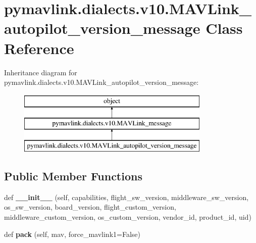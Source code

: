 \hypertarget{classpymavlink_1_1dialects_1_1v10_1_1MAVLink__autopilot__version__message}{}\section{pymavlink.\+dialects.\+v10.\+M\+A\+V\+Link\+\_\+autopilot\+\_\+version\+\_\+message Class Reference}
\label{classpymavlink_1_1dialects_1_1v10_1_1MAVLink__autopilot__version__message}
Inheritance diagram for pymavlink.\+dialects.\+v10.\+M\+A\+V\+Link\+\_\+autopilot\+\_\+version\+\_\+message\+:\begin{figure}[H]
\begin{center}
\leavevmode
\includegraphics[height=3.000000cm]{classpymavlink_1_1dialects_1_1v10_1_1MAVLink__autopilot__version__message}
\end{center}
\end{figure}
\subsection*{Public Member Functions}
\begin{DoxyCompactItemize}
\item 
\mbox{\label{classpymavlink_1_1dialects_1_1v10_1_1MAVLink__autopilot__version__message_a128e05bddb041154103e8fa108c3840f}} 
def {\bfseries \+\_\+\+\_\+init\+\_\+\+\_\+} (self, capabilities, flight\+\_\+sw\+\_\+version, middleware\+\_\+sw\+\_\+version, os\+\_\+sw\+\_\+version, board\+\_\+version, flight\+\_\+custom\+\_\+version, middleware\+\_\+custom\+\_\+version, os\+\_\+custom\+\_\+version, vendor\+\_\+id, product\+\_\+id, uid)
\item 
\mbox{\label{classpymavlink_1_1dialects_1_1v10_1_1MAVLink__autopilot__version__message_ab67f79cdf6a46eae2dbeb3cf9beb3417}} 
def {\bfseries pack} (self, mav, force\+\_\+mavlink1=False)
\end{DoxyCompactItemize}
